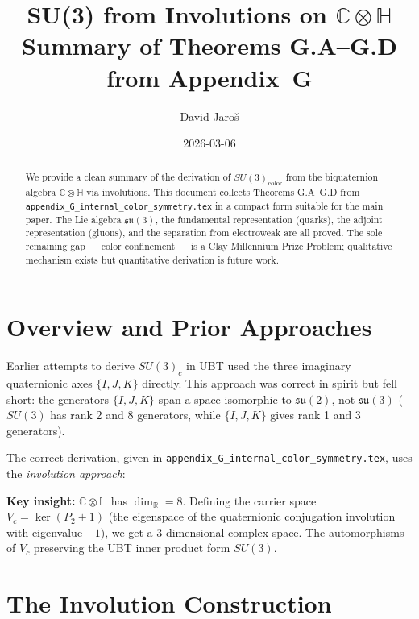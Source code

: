 \documentclass[12pt,a4paper]{article}
\title{\textbf{SU(3) from Involutions on $\mathbb{C}\otimes\mathbb{H}$}\\
         \large Summary of Theorems G.A--G.D from Appendix~G}
\author{David Jaro\v{s}}
\date{2026-03-06}
\theoremstyle{definition}
\theoremstyle{remark}
\begin{document}
  \maketitle

  \begin{abstract}
  We provide a clean summary of the derivation of $SU(3)_{\mathrm{color}}$
  from the biquaternion algebra $\mathbb{C}\otimes\mathbb{H}$ via involutions.
  This document collects Theorems G.A--G.D from
  \texttt{appendix\_G\_internal\_color\_symmetry.tex} in a compact form
  suitable for the main paper.  The Lie algebra $\mathfrak{su}(3)$, the
  fundamental representation (quarks), the adjoint representation (gluons),
  and the separation from electroweak are all proved.
  The sole remaining gap --- color confinement --- is a Clay Millennium
  Prize Problem; qualitative mechanism exists but quantitative derivation
  is future work.
  \end{abstract}
\fi

\section{Overview and Prior Approaches}
\label{sec:overview}

Earlier attempts to derive $SU(3)_c$ in UBT used the three imaginary
quaternionic axes $\{I, J, K\}$ directly.  This approach was correct
in spirit but fell short: the generators $\{I, J, K\}$ span a space
isomorphic to $\mathfrak{su}(2)$, not $\mathfrak{su}(3)$
($SU(3)$ has rank 2 and 8 generators, while $\{I,J,K\}$ gives rank 1
and 3 generators).

The correct derivation, given in \texttt{appendix\_G\_internal\_color\_symmetry.tex},
uses the \emph{involution approach}:

\begin{insightbox}
\textbf{Key insight:}
$\mathbb{C}\otimes\mathbb{H}$ has $\dim_\mathbb{R} = 8$.
Defining the carrier space $V_c = \ker(P_2 + 1)$ (the eigenspace of the
quaternionic conjugation involution with eigenvalue $-1$), we get a
3-dimensional complex space.  The automorphisms of $V_c$ preserving the
UBT inner product form $SU(3)$.
\end{insightbox}

\section{The Involution Construction}
\label{sec:involution}
\end{document}
